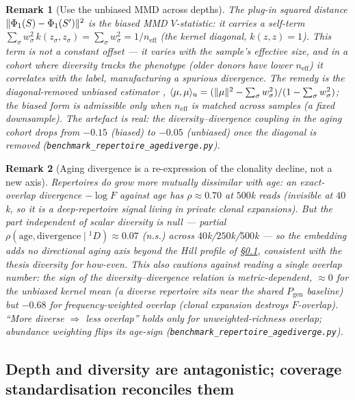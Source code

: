 \documentclass[11pt]{article}
\theoremstyle{oldplain}
\theoremstyle{oldrem}
\newtheorem{remark}{Remark}
\newcommand{\Pgen}{P_{\mathrm{gen}}}
\newcommand{\code}[1]{\texttt{#1}}
\DeclarePairedDelimiter{\norm}{\lVert}{\rVert}
\begin{document}
\begin{remark}[Use the unbiased {\normalfont\scshape MMD} across depths]\label{rem:unbiasedmmd}
The plug-in squared distance $\norm{\Phi_1(S)-\Phi_1(S')}^2$ is the \emph{biased} {\scshape MMD} $V$-statistic:
it carries a self-term $\sum_\sigma w_\sigma^2\,k(z_\sigma,z_\sigma)=\sum_\sigma w_\sigma^2=1/n_{\mathrm{eff}}$
(the kernel diagonal, $k(z,z)=1$). This term is not a constant offset --- it \emph{varies} with the sample's
effective size, and in a cohort where diversity tracks the phenotype (older donors have lower $n_{\mathrm{eff}}$)
it \emph{correlates with the label}, manufacturing a spurious divergence. The remedy is the diagonal-removed
\emph{unbiased} estimator \cite{Gretton2012}, $\langle\mu,\mu\rangle_{\mathrm u}=(\norm{\mu}^2-\sum_\sigma
w_\sigma^2)/(1-\sum_\sigma w_\sigma^2)$; the biased form is admissible only when $n_{\mathrm{eff}}$ is matched
across samples (a fixed downsample). The artefact is real: the diversity--divergence coupling in the aging
cohort drops from $-0.15$ (biased) to $-0.05$ (unbiased) once the diagonal is removed
(\code{benchmark\_repertoire\_agediverge.py}).
\end{remark}

\begin{remark}[Aging divergence is a re-expression of the clonality decline, not a new axis]\label{rem:agingaxis}
Repertoires \emph{do} grow more mutually dissimilar with age: an exact-overlap divergence $-\log F$ against age
has $\rho\approx0.70$ at $500$k reads (invisible at $40$k, so it is a \emph{deep}-repertoire signal living in
private clonal expansions). But the part independent of scalar diversity is null --- partial
$\rho(\text{age},\text{divergence}\mid{}^1D)\approx0.07$ (n.s.) across $40$k/$250$k/$500$k --- so the embedding
adds no directional aging axis beyond the Hill profile of \S\ref{sec:samp-div}, consistent with the thesis
\emph{diversity for how-even}. This also cautions against reading a single overlap number: the sign of the
diversity--divergence relation is metric-dependent, $\approx0$ for the unbiased kernel mean (a diverse repertoire
sits near the shared $\Pgen$ baseline) but $-0.68$ for frequency-weighted overlap (clonal expansion destroys
$F$-overlap). ``More diverse $\Rightarrow$ less overlap'' holds only for unweighted-richness overlap; abundance
weighting flips its age-sign (\code{benchmark\_repertoire\_agediverge.py}).
\end{remark}

\subsection{Depth and diversity are antagonistic; coverage standardisation reconciles them}\label{sec:samp-div}
\end{document}

